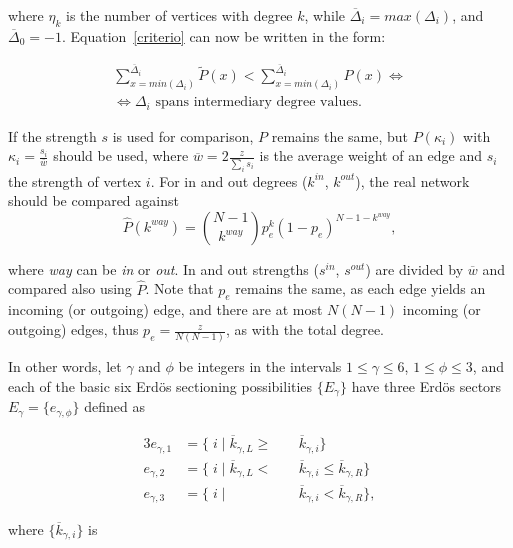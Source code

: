 \documentclass[%
	aip,
	jmp,%
	amsmath,amssymb,
	reprint,%
]{revtex4-1}
\begin{document}
\noindent where $\eta_k$ is the number of vertices with degree $k$, while $\overline{\Delta}_{i}=max(\Delta_{i})$, and $\overline{\Delta}_{0}=-1$. Equation~\ref{criterio} can now be written in the form:

\begin{equation}\label{criterio2}
	\begin{split}
		\sum_{x=min(\Delta_i)}^{\overline{\Delta}_i} \widetilde{P}(x) < \sum_{x=min(\Delta_i)}^{\overline{\Delta}_i} P(x) \Leftrightarrow \\
	\Leftrightarrow \Delta_i \text{ spans intermediary degree values.}
	\end{split}
\end{equation}

If the strength $s$ is used for comparison, $P$ remains the same, but $P(\kappa_i)$ with $\kappa_i=\frac{s_i}{\overline{w}}$ should be used, where $\overline{w}=2\frac{z}{\sum_is_i}$ is the average weight of an edge and $s_i$ the strength of vertex $i$. For in and out degrees ($k^{in}$, $k^{out}$), the real network should be compared against
\begin{equation}
	\hat{P}(k^{way})=\binom{N-1}{k^{way}}p_e^k(1-p_e)^{N-1-k^{way}},
\end{equation}

\noindent where \emph{way} can be \emph{in} or \emph{out}. In and out strengths ($s^{in}$, $s^{out}$) are divided by $\overline{w}$ and compared also using $\hat{P}$. Note that $p_e$ remains the same, as each edge yields an incoming (or outgoing) edge, and there are at most $N(N-1)$ incoming (or outgoing) edges, thus $p_e=\frac{z}{N(N-1)}$, as with the total degree.

In other words, let $\gamma$ and $\phi$ be integers in the intervals $1 \leq \gamma \leq 6$, $1 \leq \phi \leq 3$, and each of the basic six Erd\"os sectioning possibilities $\{E_{\gamma}\}$ have three Erd\"os sectors $E_{\gamma}= \{e_{\gamma, \phi} \}$ defined as

\begin{alignat}{3}\label{eq:part}
	e_{\gamma,1}&=\{\;i\;|\;\overline{k}_{\gamma,L}\geq&&\overline{k}_{\gamma,i}\} \nonumber \\
	e_{\gamma,2}&=\{\;i\;|\;\overline{k}_{\gamma,L}<\;&&\overline{k}_{\gamma,i}\leq\overline{k}_{\gamma,R}\} \\ 
	e_{\gamma,3}&=\{\;i\;|\;&&\overline{k}_{\gamma,i}<\overline{k}_{\gamma,R}\} \nonumber,
\end{alignat}

\noindent where $\{\overline{k}_{\gamma,i}\}$ is
\end{document}
